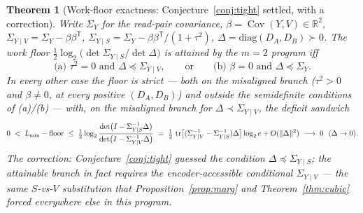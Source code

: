 \documentclass[11pt]{article}
\newtheorem{theorem}{Theorem}\newtheorem{corollary}{Corollary}
\newcommand{\Cov}{\operatorname{Cov}}\newcommand{\hX}{\widehat X}
\begin{document}
\begin{theorem}[Work-floor exactness: Conjecture~\ref{conj:tight} settled,
with a correction]\label{thm:c3}
Write $\Sigma_Y$ for the read-pair covariance, $\beta=\Cov(Y,V)\in\mathbb
R^2$, $\Sigma_{Y\mid V}=\Sigma_Y-\beta\beta^{\mathsf T}$,
$\Sigma_{Y\mid S}=\Sigma_Y-\beta\beta^{\mathsf T}/(1{+}\tau^2)$,
$\Delta=\mathrm{diag}(D_A,D_B)\succ0$. The work floor
$\tfrac12\log_2\bigl(\det\Sigma_{Y\mid S}/\det\Delta\bigr)$ is attained by
the $m{=}2$ program iff
\[
\text{(a) } \tau^2=0 \text{ and } \Delta\preceq\Sigma_{Y\mid V},
\qquad\text{or}\qquad
\text{(b) } \beta=0 \text{ and } \Delta\preceq\Sigma_Y .
\]
In every other case the floor is strict --- both on the misaligned branch
($\tau^2>0$ and $\beta\ne0$, at every positive $(D_A,D_B)$) and outside
the semidefinite conditions of (a)/(b) --- with, on the misaligned branch
for $\Delta\prec\Sigma_{Y\mid V}$, the deficit sandwich
\[
0\;<\;L_{\min}-\mathrm{floor}\;\le\;
\tfrac12\log_2\frac{\det\bigl(I-\Sigma_{Y\mid S}^{-1}\Delta\bigr)}
{\det\bigl(I-\Sigma_{Y\mid V}^{-1}\Delta\bigr)}
\;=\;\tfrac12\,\operatorname{tr}\bigl[(\Sigma_{Y\mid V}^{-1}-\Sigma_{Y\mid S}^{-1})
\Delta\bigr]\log_2 e+O(\|\Delta\|^2)\;\longrightarrow\;0
\ \ (\Delta\to0).
\]
\emph{The correction:} Conjecture~\ref{conj:tight} guessed the condition
$\Delta\preceq\Sigma_{Y\mid S}$; the attainable branch in fact requires
the \emph{encoder-accessible} conditional $\Sigma_{Y\mid V}$ --- the same
$S$-vs-$V$ substitution that Proposition~\ref{prop:marg} and
Theorem~\ref{thm:cubic} forced everywhere else in this program.
\end{theorem}
\end{document}
